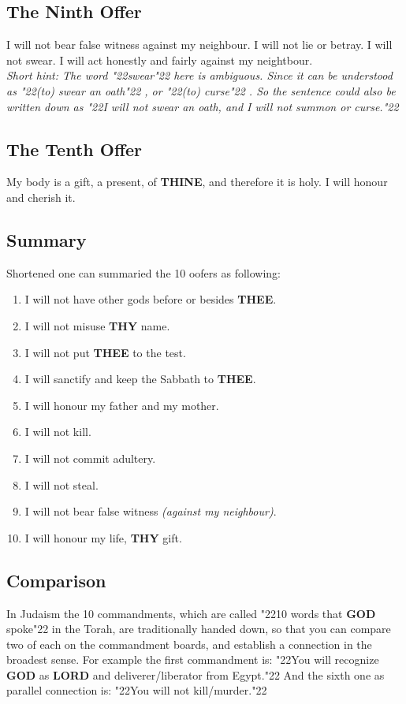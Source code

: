 \documentclass[12pt,a4paper]{article}
\newcommand{\God}[0]{\textbf{GOD}}
\newcommand{\Lord}[0]{\textbf{LORD}}
\newcommand{\Thee}[0]{\textbf{THEE}}
\newcommand{\Thine}[0]{\textbf{THINE}}
\newcommand{\Thy}[0]{\textbf{THY}}
\newcommand{\q}[1]{\char"22{#1}\char"22 }
\begin{document}
	\subsection{The Ninth Offer}
		I will not bear false witness against my neighbour.
		I will not lie or betray.
		I will not swear.
		I will act honestly and fairly against my neightbour.
		\\
		\textit{Short hint:
		The word \q{swear} here is ambiguous.
		Since it can be understood as \q{(to) swear an oath},
		or \q{(to) curse}.
		So the sentence could also be written down as
		\q{I will not swear an oath, and I will not summon or curse.}}
		
	\subsection{The Tenth Offer}
		My body is a gift, a present, of {\Thine},
		and therefore it is holy.
		I will honour and cherish it.

	\subsection{Summary}
		Shortened one can summaried the 10 oofers as following:
		\\
		\begin{enumerate}[nosep]
			\item I will not have other gods before or besides {\Thee}.
			\item I will not misuse {\Thy} name.
			\item I will not put {\Thee} to the test.
			\item I will sanctify and keep the Sabbath to {\Thee}.
			\item I will honour my father and my mother.
			\item I will not kill.
			\item I will not commit adultery.
			\item I will not steal.
			\item I will not bear false witness \textit{(against my neighbour)}.
			\item I will honour my life, {\Thy} gift.
		\end{enumerate}
		
	\subsection{Comparison}
		In Judaism the 10 commandments,
		which are called \q{10 words that {\God} spoke} in the Torah,
		are traditionally handed down,
		so that you can compare two of each on the commandment boards,
		and establish a connection in the broadest sense.
		For example the first commandment is:
		\q{You will recognize {\God} as {\Lord} and deliverer/liberator from Egypt.}
		And the sixth one as parallel connection is:
		\q{You will not kill/murder.}
\end{document}
